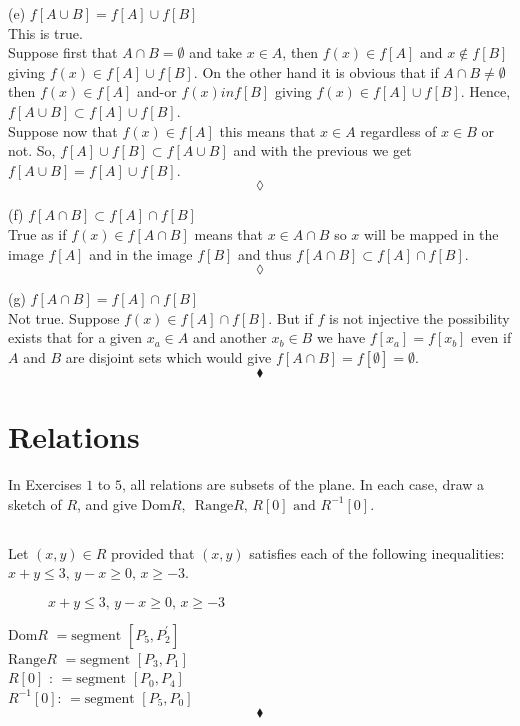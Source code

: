 (e)  $f[A\cup B]= f[A]\cup f[B]$ \\
This is  true. \\
Suppose first that $A\cap B=\emptyset$ and take $x\in A$, then $f(x) \in f[A]$ and $x\not \in f[B]$ giving $f(x)\in f[A]\cup f[B]$. On the other hand it is obvious that if $A\cap B\ne\emptyset$ then $f(x) \in f[A]$ and-or $f(x) in f[B]$ giving $f(x) \in f[A]\cup f[B]$. Hence, $f[A\cup B]\subset f[A]\cup f[B]$.\\
Suppose now that $f(x) \in f[A]$ this means that $x\in A$ regardless of $x\in B$ or not. So, $f[A]\cup f[B]\subset f[A\cup B]$ and with the previous we get $f[A\cup B]= f[A]\cup f[B]$.
$$\lozenge$$

(f)  $f[A\cap B]\subset f[A]\cap f[B]$ \\
True as if $f(x) \in f[A\cap B]$ means that $x\in A\cap B$ so $x $ will be mapped in the image $f[A]$ and in the image $f[B]$ and thus $f[A\cap B]\subset f[A]\cap f[B]$.
$$\lozenge$$

(g)  $f[A\cap B] = f[A]\cap f[B]$ \\
Not true.
Suppose $f(x) \in f[A]\cap f[B]$. But if $f$ is not injective the possibility exists that for a given $x_a\in A$ and another $x_b \in B$ we have $f[x_a]= f[x_b]$ even if $A$ and $B$ are disjoint sets which would give $f[A\cap B]=f[\emptyset]=\emptyset$.
$$\blacklozenge$$
\newpage


 \section{Relations}
 In Exercises $1$ to $5$, all relations are subsets of the plane. In each case, draw a sketch of $R$, and give $\text{Dom}R,\, \text{ Range} R,\, R[0] \text{ and  } R^{-1}[0]$.
\subsection{}
\begin{tcolorbox}
 Let $(x,y)\in R$ provided that $(x,y)$ satisfies each of the following inequalities: $x+y\le 3,\,y-x \ge 0,\, x \ge -3$.
\end{tcolorbox}
\begin{figure}[H]%
    \centering
    
\caption{$x+y\le 3,\,y-x \ge 0,\, x \ge -3$}
\label{fig:fig_p8b}
\end{figure}
$$ $$
\textbf{$\text{Dom}R$} $=\text{segment }[P_5,P_2^{'}]$\\
\textbf{$\text{Range} R$} $=\text{segment }[P_3,P_1]$\\
\textbf{$R[0]$ }: $=\text{segment }[P_0,P_4]$\\
\textbf{$R^{-1}[0]$}: $=\text{segment }[P_5,P_0]$
$$\blacklozenge$$

